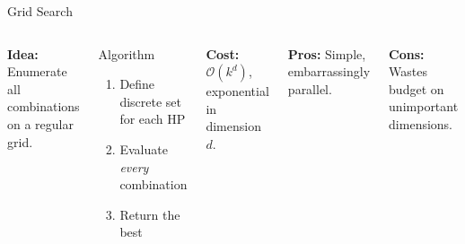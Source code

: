 \documentclass[aspectratio=169,11pt]{beamer}
\newcommand{\emphc}[1]{\textcolor{harvardcrimson}{#1}}
\begin{document}
\begin{frame}{Grid Search}
\begin{columns}[T]
\textbf{Idea:} Enumerate all combinations on a regular grid.

\vspace{0.3cm}
\begin{block}{Algorithm}
\begin{enumerate}
    \item Define discrete set for each HP
    \item Evaluate \emph{every} combination
    \item Return the best
\end{enumerate}
\end{block}

\vspace{0.2cm}
\textbf{Cost:} $\mathcal{O}(k^d)$, exponential in dimension $d$.

\vspace{0.2cm}
\textbf{Pros:} Simple, embarrassingly parallel.

\textbf{Cons:} Wastes budget on \emphc{unimportant} dimensions.

\begin{center}
\end{center}
\end{columns}
\end{frame}
\end{document}
